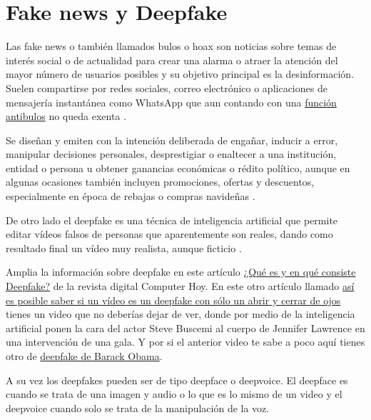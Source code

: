 \documentclass[
  spanish,
  a4paper,
  openany]{book}
\begin{document}
\hypertarget{fake-news-y-deepfake}{%
\section{Fake news y Deepfake}\label{fake-news-y-deepfake}}

Las fake news o también llamados bulos o hoax son noticias sobre temas de interés social o de actualidad para crear una alarma o atraer la atención del mayor número de usuarios posibles y su objetivo principal es la desinformación. Suelen compartirse por redes sociales, correo electrónico o aplicaciones de mensajería instantánea como WhatsApp que aun contando con una \href{https://www.osi.es/es/actualidad/blog/2020/04/27/whatsapp-y-su-funcion-antibulos-descubrela}{función antibulos} no queda exenta \citep{OSI-bulos-buenas-practicas}.

Se diseñan y emiten con la intención deliberada de engañar, inducir a error, manipular decisiones personales, desprestigiar o enaltecer a una institución, entidad o persona u obtener ganancias económicas o rédito político, aunque en algunas ocasiones también incluyen promociones, ofertas y descuentos, especialmente en época de rebajas o compras navideñas \citep{WIKI-fake-news}.

De otro lado el deepfake es una técnica de inteligencia artificial que permite editar vídeos falsos de personas que aparentemente son reales, dando como resultado final un vídeo muy realista, aunque ficticio \citep{WIKI-deepfake}.

Amplia la información sobre deepfake en este artículo \href{https://computerhoy.com/reportajes/tecnologia/consiste-deepfake-446355}{¿Qué es y en qué consiste Deepfake?} de la revista digital Computer Hoy. En este otro artículo llamado \href{https://www.xataka.com/inteligencia-artificial/posible-saber-video-deepfake-solo-abrir-cerrar-ojos-literalmente-quizas-eso-no-sea-suficiente}{así es posible saber si un vídeo es un deepfake con sólo un abrir y cerrar de ojos} tienes un video que no deberías dejar de ver, donde por medio de la inteligencia artificial ponen la cara del actor Steve Buscemi al cuerpo de Jennifer Lawrence en una intervención de una gala. Y por si el anterior video te sabe a poco aquí tienes otro de \href{https://www.youtube.com/watch?v=cQ54GDm1eL0}{deepfake de Barack Obama}.

A su vez los deepfakes pueden ser de tipo deepface o deepvoice. El deepface es cuando se trata de una imagen y audio o lo que es lo mismo de un video y el deepvoice cuando solo se trata de la manipulación de la voz.
\end{document}
